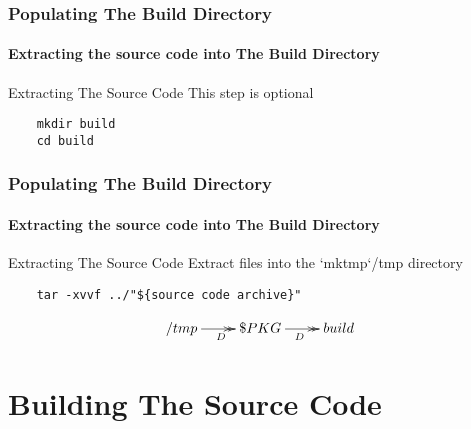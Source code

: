 \documentclass[12pt,hyperref={pdfpagelabels=true}]{beamer}
\begin{document}
\begin{frame}[fragile]
  \frametitle{Populating The Build Directory}
  \framesubtitle{Extracting the source code into The Build Directory}
  \lstset{language=sh}
  
  \pause
  
  \begin{alertblock}{Extracting The Source Code}
    This step is optional
  \end{alertblock}
  
  \pause
  
  \begin{lstlisting}
    mkdir build
    cd build
  \end{lstlisting}
  
  
\end{frame}

\begin{frame}[fragile]
  \frametitle{Populating The Build Directory}
  \framesubtitle{Extracting the source code into The Build Directory}
  \lstset{language=sh}  
  
  
  \begin{block}{Extracting The Source Code}
    Extract files into the `mktmp`/tmp directory
  \end{block}
  
  \pause
  
  \begin{lstlisting}
    tar -xvvf ../"${source code archive}"
  \end{lstlisting}

  \pause

  \begin{equation*}
    \xymatrix@C=2pc@R=2pc{
      \//tmp\ar@{->>}[r]_D & \/\$PKG\ar@{->>}[r]_D & \/build}
  \end{equation*}
\end{frame}

\section{Building The Source Code}
\end{document}
